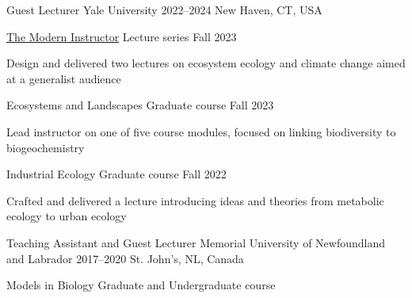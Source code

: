 

\begin{cventries}

  \cventry
    {Guest Lecturer} %
    {Yale University} %
    {2022--2024} %
    {New Haven, CT, USA} %
    {
      \begin{cvsubentries}
       \cvsubentry
        {\href{https://ypa.yale.edu/skills-and-career-development/modern-instructor}{The Modern Instructor}}
        {\footnotesize Lecture series}
        {Fall 2023}
        {
         \begin{cvitems}
          \item Design and delivered two lectures on ecosystem ecology and climate change aimed at a generalist audience
         \end{cvitems} 
        }
       \cvsubentry
        {Ecosystems and Landscapes}
        {\footnotesize Graduate course}
        {Fall 2023}
        {
         \begin{cvitems}
          \item Lead instructor on one of five course modules, focused on linking biodiversity to biogeochemistry
         \end{cvitems} 
        }
       \cvsubentry
         {Industrial Ecology}
         {\footnotesize Graduate course}
         {Fall 2022}
         {
         \begin{cvitems}
          \item Crafted and delivered a lecture introducing ideas and theories from metabolic ecology to urban ecology
         \end{cvitems} 
         }
      \end{cvsubentries}
    }
  \cventry
    {Teaching Assistant and Guest Lecturer} %
    {Memorial University of Newfoundland and Labrador} %
    {2017--2020} %
    {St. John's, NL, Canada} %
    {
      \begin{cvsubentries}
       \cvsubentry
         {Models in Biology}
         {\footnotesize Graduate and Undergraduate course}

\end{cvsubentries}}
\end{cventries}
